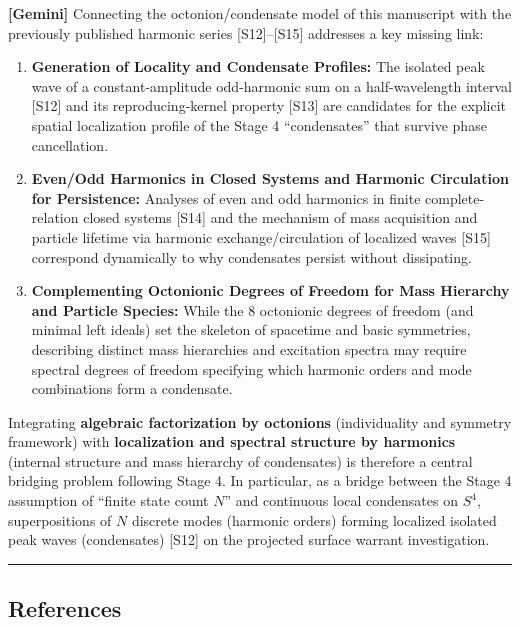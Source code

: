 \documentclass[
  a4paper,
]{article}
\providecommand{\tightlist}{%
  \setlength{\itemsep}{0pt}\setlength{\parskip}{0pt}}
\begin{document}
\textbf{{[}Gemini{]}} Connecting the octonion/condensate model of this
manuscript with the previously published harmonic series
{[}S12{]}--{[}S15{]} addresses a key missing link:

\begin{enumerate}
\def\labelenumi{\arabic{enumi}.}
\tightlist
\item
  \textbf{Generation of Locality and Condensate Profiles:} The isolated
  peak wave of a constant-amplitude odd-harmonic sum on a
  half-wavelength interval {[}S12{]} and its reproducing-kernel property
  {[}S13{]} are candidates for the explicit spatial localization profile
  of the Stage 4 ``condensates'' that survive phase cancellation.
\item
  \textbf{Even/Odd Harmonics in Closed Systems and Harmonic Circulation
  for Persistence:} Analyses of even and odd harmonics in finite
  complete-relation closed systems {[}S14{]} and the mechanism of mass
  acquisition and particle lifetime via harmonic exchange/circulation of
  localized waves {[}S15{]} correspond dynamically to why condensates
  persist without dissipating.
\item
  \textbf{Complementing Octonionic Degrees of Freedom for Mass Hierarchy
  and Particle Species:} While the 8 octonionic degrees of freedom (and
  minimal left ideals) set the skeleton of spacetime and basic
  symmetries, describing distinct mass hierarchies and excitation
  spectra may require spectral degrees of freedom specifying which
  harmonic orders and mode combinations form a condensate.
\end{enumerate}

Integrating \textbf{algebraic factorization by octonions} (individuality
and symmetry framework) with \textbf{localization and spectral structure
by harmonics} (internal structure and mass hierarchy of condensates) is
therefore a central bridging problem following Stage 4. In particular,
as a bridge between the Stage 4 assumption of ``finite state count
\(N\)'' and continuous local condensates on \(S^4\), superpositions of
\(N\) discrete modes (harmonic orders) forming localized isolated peak
waves (condensates) {[}S12{]} on the projected surface warrant
investigation.

\begin{center}\rule{0.5\linewidth}{0.5pt}\end{center}

\subsection{References}\label{references}
\end{document}
